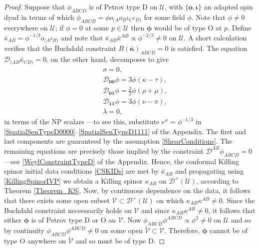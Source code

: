 \documentclass[10pt,a4paper]{article}
\theoremstyle{plain}
\def\bmo{{\bm o}}
\begin{document}
\begin{proof}
Suppose that $\phi_{ABCD}$ is of Petrov type D on $\mathcal{U}$, with $\lbrace \bmo, \bm\iota\rbrace$ an adapted spin dyad in terms of which $\phi_{ABCD}=\phi o_{(A}o_B\iota_C\iota_{D)}$ for some field $\phi$. Note that $\phi\neq 0$ everywhere on $\mathcal{U}$; if $\phi=0$ at some $p\in\mathcal{U}$ then $\bm\phi$ would be of type O at $p$. Define $\bar{\kappa}_{AB}=\phi^{-1/3}o_{(A}\iota_{B)}$ and note that $\bar{\kappa}_{AB}\bar{\kappa}^{AB}\propto\phi^{-2/3}\neq 0$ on $\mathcal{U}$. A short calculation verifies that the Buchdahl constraint $B(\bar{\bm\kappa})_{ABCD}=0$ is satisfied. The equation $\mathcal{D}_{(AB}\bar{\kappa}_{CD)}=0$, on the other hand, decomposes to give
\begin{eqnarray*}
&& \sigma=0,\\
&& \mathcal{D}_{\bm0\bm0}\phi = 3\phi(\kappa - \tau), \\
&& \mathcal{D}_{\bm0\bm1}\phi = \tfrac{3}{2} \phi(\rho + \mu),\\
&& \mathcal{D}_{\bm1\bm1}\phi = 3\phi(\nu - \pi), \\
&& \lambda = 0,
\end{eqnarray*}
in terms of the NP scalars ---to see this, substitute $e^{\varkappa}=\phi^{-1/3}$ in \eqref{SpatialSenTypeD0000}--\eqref{SpatialSenTypeD1111} of the Appendix.
The first and last components are guaranteed by the assumption \eqref{ShearConditions}.
The remaining equations are precisely those implied by the constraint $\mathcal{D}^{AB}\phi_{ABCD}=0$ ---see \eqref{WeylConstraintTypeD} of the Appendix.
Hence, the conformal Killing spinor initial data conditions \eqref{CSKIDs} are met by $\bar{\kappa}_{AB}$ and propagating using \eqref{KillingSpinorIVP} we obtain a Killing spinor $\kappa_{AB}$ on $\mathcal{D}^+(\mathcal{U})$, according to Theorem \ref{Theorem_KS}. Now, by continuous dependence on the data, it follows that there exists some open subset $\mathcal{V}\subset\mathcal{D}^+(\mathcal{U})$ on which $\kappa_{AB}\kappa^{AB}\neq 0$. Since the Buchdahl constraint neceessarily holds on $\mathcal{V}$ and since $\kappa_{AB}\kappa^{AB}\neq 0$, it follows that either $\bm\phi$ is of Petrov type D or O on $\mathcal{V}$. Now $\phi_{ABCD}\phi^{ABCD}\propto \phi^2\neq 0$ on $\mathcal{U}$ and so by continuity $\phi_{ABCD}\phi^{ABCD}\neq 0$ on some open $\tilde{\mathcal{V}}\subset\mathcal{V}$. Therefore, $\bm\phi$ cannot be of type O anywhere on $\tilde{\mathcal{V}}$ and so must be of type D.
\end{proof}
\end{document}
